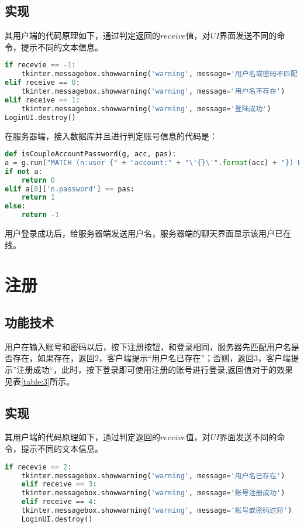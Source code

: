 \documentclass[forprint]{OSPaper}
\begin{document}
\subsection{实现}

其用户端的代码原理如下，通过判定返回的$receive$值，对$UI$界面发送不同的命令，提示不同的文本信息。

\begin{lstlisting}[language=Python]
if recevie == -1:
	tkinter.messagebox.showwarning('warning', message='用户名或密码不匹配')
elif receive == 0:
	tkinter.messagebox.showwarning('warning', message='用户名不存在')
elif receive == 1:
	tkinter.messagebox.showwarning('warning', message='登陆成功')
LoginUI.destroy()
\end{lstlisting} 

在服务器端，接入数据库并且进行判定账号信息的代码是：

\begin{lstlisting}[language=Python]
def isCoupleAccountPassword(g, acc, pas):
a = g.run("MATCH (n:user {" + "account:" + "\'{}\'".format(acc) + "}) RETURN n.password").data()
if not a:
	return 0
elif a[0]['n.password'] == pas:
	return 1
else:
	return -1
\end{lstlisting} 

用户登录成功后，给服务器端发送用户名，服务器端的聊天界面显示该用户已在线。

\section{注册}

\subsection{功能技术}

用户在输入账号和密码以后，按下注册按钮，和登录相同，服务器先匹配用户名是否存在，如果存在，返回2，客户端提示“用户名已存在”；否则，返回3，客户端提示”注册成功“，此时，按下登录即可使用注册的账号进行登录,返回值对于的效果见表\ref{table:3}所示。

\subsection{实现}

其用户端的代码原理如下，通过判定返回的$receive$值，对$UI$界面发送不同的命令，提示不同的文本信息。

\begin{lstlisting}[language=Python]
	if recevie == 2:
	tkinter.messagebox.showwarning('warning', message='用户名已存在')
	elif receive == 3:
	tkinter.messagebox.showwarning('warning', message='账号注册成功')
	elif receive == 4:
	tkinter.messagebox.showwarning('warning', message='账号或密码过短')
	LoginUI.destroy()
\end{lstlisting} 
\end{document}
